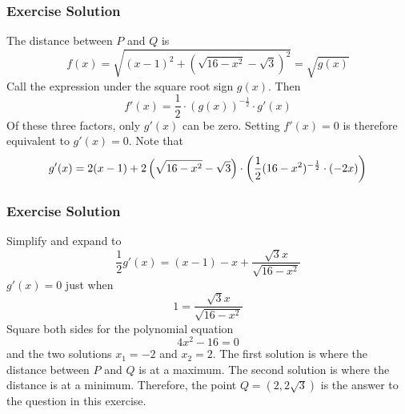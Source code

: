 \documentclass[xcolor=dvipsnames]{beamer}
\begin{document}
\begin{frame}
  \frametitle{Exercise Solution}
  The distance between $P$ and $Q$ is
\begin{equation}
  \label{eq:ohghoote}
  f(x)=\sqrt{(x-1)^{2}+(\sqrt{16-x^{2}}-\sqrt{3})^{2}}=\sqrt{g(x)}
\end{equation}
Call the expression under the square root sign $g(x)$. Then
\begin{equation}
  \label{eq:ouwophai}
  f'(x)=\frac{1}{2}\cdot\left(g(x)\right)^{-\frac{1}{2}}\cdot{}g'(x)
\end{equation}
Of these three factors, only $g'(x)$ can be zero. Setting $f'(x)=0$ is
therefore equivalent to $g'(x)=0$. Note that
\begin{equation}
  \label{eq:poqueebo}
  g'(x)=2(x-1)+2\left(\sqrt{16-x^{2}}-\sqrt{3}\right)\cdot\left(\frac{1}{2}(16-x^{2})^{-\frac{1}{2}}\cdot(-2x)\right)\notag
\end{equation}
\end{frame}

\begin{frame}
  \frametitle{Exercise Solution}
Simplify and expand to
\begin{equation}
  \label{eq:deiquoot}
  \frac{1}{2}g'(x)=(x-1)-x+\frac{\sqrt{3}x}{\sqrt{16-x^{2}}}
\end{equation}
$g'(x)=0$ just when
\begin{equation}
  \label{eq:xoonahju}
  1=\frac{\sqrt{3}x}{\sqrt{16-x^{2}}}
\end{equation}
Square both sides for the polynomial equation
\begin{equation}
  \label{eq:uabaevoo}
4x^{2}-16=0
\end{equation}
and the two solutions $x_{1}=-2$ and $x_{2}=2$. The first solution is
where the distance between $P$ and $Q$ is at a maximum. The second
solution is where the distance is at a minimum. Therefore, the point
$Q=(2,2\sqrt{3})$ is the answer to the question in this exercise.
\end{frame}
\end{document}
